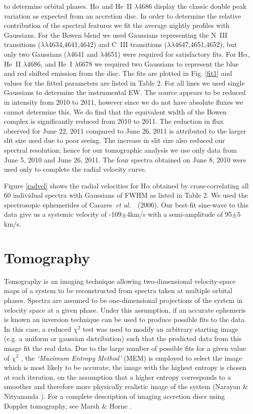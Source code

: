 \documentclass{aa}
\def\etal{{\em et al.}\ }
\begin{document}
to determine orbital phases.  H$\alpha$ and He~II $\lambda$4686
display
the classic double peak variation as expected from an accretion disc.
In order to determine the relative contribution of the spectral 
features we fit the average nightly profiles with Gaussians.  For the
Bowen blend we used Gaussians representing the N~III transitions 
($\lambda\lambda$4634,4641,4642) 
and C~III transitions 
($\lambda\lambda$4647,4651,4652), but only two Gaussians ($\lambda$4641
and $\lambda$4651) were required for satisfactory fits.  
For H$\alpha$, He~II $\lambda$4686, and He~I $\lambda$6678 we 
required two Gaussians to
represent the blue and red shifted emission from the disc.
The fits are plotted in Fig. \ref{fit1} and values for the fitted parameters are listed in Table 2. For all lines we used single Gaussians to determine
the instrumental EW. 
The source appears to be reduced in intensity from 2010
to 2011, however since we do not have absolute fluxes we
cannot determine this.  We do find that the equivalent width
of the Bowen complex is significantly reduced from 2010 to 2011. 
The reduction in flux observed for June 22, 2011 compared to June 26, 2011 is 
attributed to the larger slit size used due to poor seeing. 
The increase in slit size also reduced our spectral resolution;
hence for our tomographic analysis we use only data from June 5, 2010 and June 26, 2011.
The four spectra obtained on June 8, 2010 were used only to
complete the radial velocity curve.

Figure \ref{radvel} shows the radial velocities for H$\alpha$ 
obtained by cross-correlating all 60 individual spectra with Gaussians of FWHM
as listed in Table 2.   
We used the spectrosopic ephemerides of Casares~\etal~(2006).  Our best-fit 
sine-wave to this data give us a systemic velocity of -109$\pm$4km/s with a
semi-amplitude of 95$\pm5$km/s. 


\section{Tomography}

Tomography is an imaging technique allowing two-dimensional velocity-space maps of a system to be reconstructed from spectra taken at multiple orbital phases. Spectra are assumed to be one-dimensional projections of the system in velocity space at a given phase. Under this assumption, if an accurate ephemeris is known an inversion technique can be used to produce possible fits to the data. In this case, a reduced $\chi^2$ test was used to modify an arbitrary starting image (e.g. a uniform or gaussian distribution) such that the predicted data from this image fit the real data. Due to the large number of possible fits for a given value of $\chi^2$ , the {\it `Maximum Entropy Method'} (MEM) is employed to select the image which is most likely to be accurate; the image with the highest entropy is chosen at each iteration, on the assumption that a higher entropy corresponds to a smoother and therefore more physically realistic image of the system (Narayan \& Nityananda \cite{narayan}). For a complete description of imaging accretion discs using Doppler tomography, see Marsh \& Horne \cite{marsh}.
\end{document}
